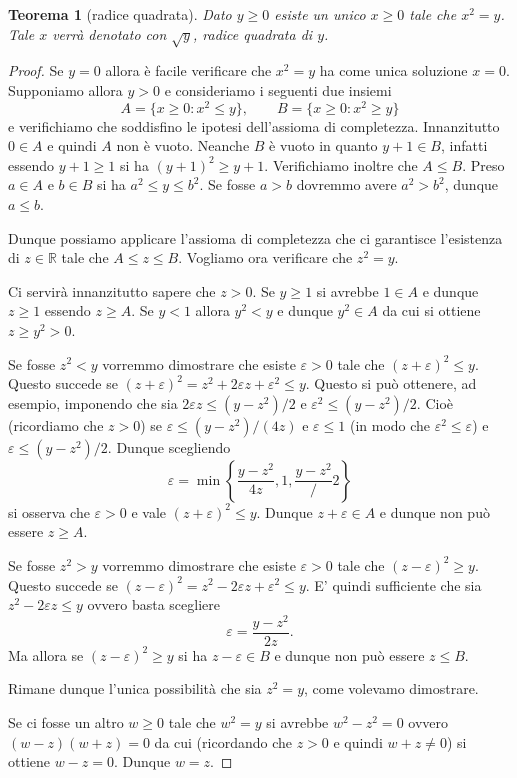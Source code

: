 \documentclass[italian,a4paper,oneside,headinclude]{scrbook}
\newcommand{\eps}{\varepsilon}
\newcommand{\RR}{\mathbb R}
\newtheorem{theorem}{Teorema}
\begin{document}
\begin{theorem}[radice quadrata]
Dato $y\ge 0$ esiste un unico $x\ge 0$ tale che $x^2=y$.
Tale $x$ verrà denotato con $\sqrt y$, \emph{radice quadrata} di $y$.
\marginpar{$\sqrt{\cdot}$}
\end{theorem}
\begin{proof}
Se $y=0$ allora è facile verificare che $x^2=y$ ha come unica soluzione $x=0$.
Supponiamo allora $y>0$ e
consideriamo i seguenti due insiemi
\[
  A = \{x\ge 0 \colon x^2 \le y\},\qquad
  B = \{x\ge 0 \colon x^2 \ge y\}
\]
e verifichiamo che soddisfino le ipotesi dell'assioma di completezza.
Innanzitutto $0\in A$ e quindi $A$ non è vuoto.
Neanche $B$ è vuoto in quanto $y+1\in B$,
infatti essendo $y+1\ge 1$ si ha
$(y+1)^2 \ge y+1$. Verifichiamo inoltre che $A \le B$.
Preso $a\in A$ e $b\in B$ si ha $a^2 \le y \le b^2$.
Se fosse $a>b$ dovremmo avere $a^2>b^2$, dunque $a \le b$.

Dunque possiamo applicare l'assioma di completezza
che ci garantisce l'esistenza di $z\in \RR$ tale che $A \le z \le B$.
Vogliamo ora verificare che $z^2 = y$.

Ci servirà innanzitutto sapere che $z>0$. Se $y\ge 1$ si avrebbe $1\in A$
e dunque $z\ge 1$ essendo $z\ge A$. Se $y<1$ allora $y^2 < y$ e dunque $y^2 \in A$
da cui si ottiene $z\ge y^2 > 0$.

Se fosse $z^2 < y$ vorremmo dimostrare che esiste $\eps>0$ tale che
$(z+\eps)^2 \le y$.
Questo succede se $(z+\eps)^2 = z^2 + 2 \eps z + \eps^2 \le y$.
Questo si può ottenere, ad esempio,
imponendo che sia $2\eps z \le (y-z^2)/2$ e $\eps^2 \le (y-z^2)/2$.
Cioè (ricordiamo che $z>0$) se $\eps \le (y-z^2)/(4z)$ e $\eps \le 1$
(in modo che $\eps^2 \le \eps$)
e $\eps \le (y-z^2)/2$. Dunque scegliendo
\[
\eps = \min\left\{ \frac{y-z^2}{4z}, 1, \frac{y-z^2}/2\right\}
\]
si osserva che $\eps>0$ e vale $(z+\eps)^2\le y$.
Dunque $z+\eps \in A$ e dunque non può essere $z\ge A$.

Se fosse $z^2 > y$ vorremmo dimostrare che esiste $\eps>0$ tale che
$(z-\eps)^2 \ge y$.
Questo succede se $(z-\eps)^2 = z^2 - 2\eps z + \eps^2 \le y$.
E' quindi sufficiente che sia $z^2 - 2 \eps z \le y$ ovvero basta scegliere
\[
  \eps = \frac{y-z^2}{2z}.
\]
Ma allora se $(z-\eps)^2\ge y$ si ha $z-\eps \in B$ e dunque non può
essere $z \le B$.

Rimane dunque l'unica possibilità che sia $z^2 = y$, come volevamo dimostrare.

Se ci fosse un altro $w\ge 0$ tale che $w^2 = y$ si avrebbe $w^2 - z^2=0$ ovvero
$(w-z)(w+z)=0$ da cui (ricordando che $z>0$ e quindi $w+z\neq 0$)
si ottiene $w-z=0$. Dunque $w=z$.
\end{proof}
\end{document}
